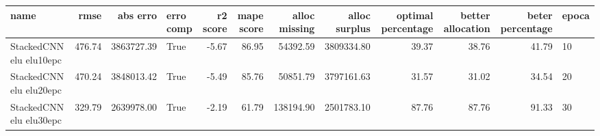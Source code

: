 \begin{tabular}{lrrlrrrrrrrl}
\toprule
name & rmse & abs erro & erro comp & r2 score & mape score & alloc missing & alloc surplus & optimal percentage & better allocation & beter percentage & epoca \\
\midrule
StackedCNN elu elu10epc & 476.74 & 3863727.39 & True & -5.67 & 86.95 & 54392.59 & 3809334.80 & 39.37 & 38.76 & 41.79 & 10 \\
StackedCNN elu elu20epc & 470.24 & 3848013.42 & True & -5.49 & 85.76 & 50851.79 & 3797161.63 & 31.57 & 31.02 & 34.54 & 20 \\
StackedCNN elu elu30epc & 329.79 & 2639978.00 & True & -2.19 & 61.79 & 138194.90 & 2501783.10 & 87.76 & 87.76 & 91.33 & 30 \\
\bottomrule
\end{tabular}
